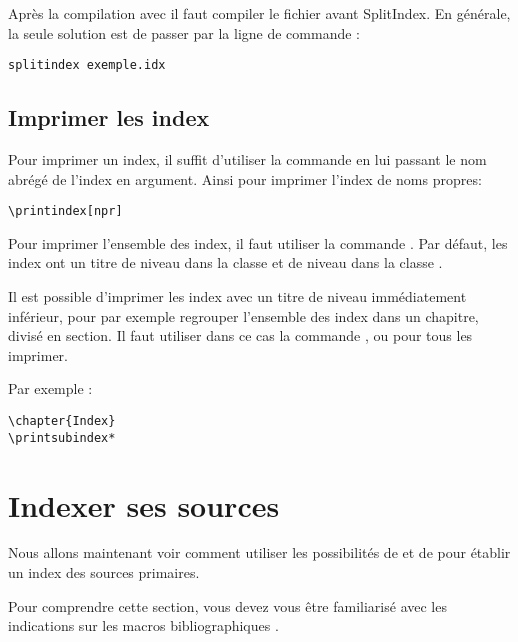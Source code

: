 {\begin{verbatim}
\end{verbatim}

Après la compilation avec \XeLaTeX il faut compiler le fichier  avant SplitIndex. En générale, la seule solution est de passer par la ligne de commande :

\begin{verbatim}
splitindex exemple.idx
\end{verbatim}

\subsection{Imprimer les index}

Pour imprimer un index, il suffit d'utiliser la commande  en lui passant le nom abrégé de l'index en argument. Ainsi pour imprimer l'index de noms propres:

\begin{verbatim}
\printindex[npr]
\end{verbatim}

Pour imprimer l'ensemble des index, il faut utiliser la commande .
Par défaut, les index ont un titre de niveau  dans la classe  et de niveau  dans la classe .

 Il est possible d'imprimer les index avec un titre de niveau immédiatement inférieur, pour par exemple regrouper l'ensemble des index dans un chapitre, divisé en section. Il faut utiliser dans ce cas la commande , ou  pour tous les imprimer.

Par exemple :

\begin{verbatim}
\chapter{Index}
\printsubindex*
\end{verbatim}

\section{Indexer ses sources}


Nous allons maintenant voir comment utiliser les possibilités de  et de  pour établir un index des sources primaires.

Pour comprendre cette section, vous devez vous être familiarisé avec les indications sur les macros bibliographiques .



}

